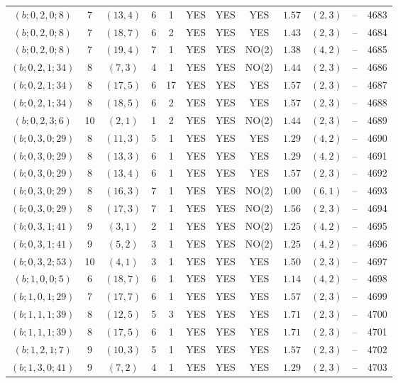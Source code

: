 \begin{longtable}{|c|c|c|c|c|c|c|c|c|c|c|c|}
$(b;0,2,0;8)$ & 7 & $(13,4)$ & 6 & 1 & YES & YES & YES & $1.57$ & $(2,3)$ & -- & 4683\\
$(b;0,2,0;8)$ & 7 & $(18,7)$ & 6 & 2 & YES & YES & YES & $1.43$ & $(2,3)$ & -- & 4684\\
$(b;0,2,0;8)$ & 7 & $(19,4)$ & 7 & 1 & YES & YES & NO(2) & $1.38$ & $(4,2)$ & -- & 4685\\
$(b;0,2,1;34)$ & 8 & $(7,3)$ & 4 & 1 & YES & YES & NO(2) & $1.44$ & $(2,3)$ & -- & 4686\\
$(b;0,2,1;34)$ & 8 & $(17,5)$ & 6 & 17 & YES & YES & YES & $1.57$ & $(2,3)$ & -- & 4687\\
$(b;0,2,1;34)$ & 8 & $(18,5)$ & 6 & 2 & YES & YES & YES & $1.57$ & $(2,3)$ & -- & 4688\\
$(b;0,2,3;6)$ & 10 & $(2,1)$ & 1 & 2 & YES & YES & NO(2) & $1.44$ & $(2,3)$ & -- & 4689\\
$(b;0,3,0;29)$ & 8 & $(11,3)$ & 5 & 1 & YES & YES & YES & $1.29$ & $(4,2)$ & -- & 4690\\
$(b;0,3,0;29)$ & 8 & $(13,3)$ & 6 & 1 & YES & YES & YES & $1.29$ & $(4,2)$ & -- & 4691\\
$(b;0,3,0;29)$ & 8 & $(13,4)$ & 6 & 1 & YES & YES & YES & $1.57$ & $(2,3)$ & -- & 4692\\
$(b;0,3,0;29)$ & 8 & $(16,3)$ & 7 & 1 & YES & YES & NO(2) & $1.00$ & $(6,1)$ & -- & 4693\\
$(b;0,3,0;29)$ & 8 & $(17,3)$ & 7 & 1 & YES & YES & NO(2) & $1.56$ & $(2,3)$ & -- & 4694\\
$(b;0,3,1;41)$ & 9 & $(3,1)$ & 2 & 1 & YES & YES & NO(2) & $1.25$ & $(4,2)$ & -- & 4695\\
$(b;0,3,1;41)$ & 9 & $(5,2)$ & 3 & 1 & YES & YES & NO(2) & $1.25$ & $(4,2)$ & -- & 4696\\
$(b;0,3,2;53)$ & 10 & $(4,1)$ & 3 & 1 & YES & YES & YES & $1.50$ & $(2,3)$ & -- & 4697\\
$(b;1,0,0;5)$ & 6 & $(18,7)$ & 6 & 1 & YES & YES & YES & $1.14$ & $(4,2)$ & -- & 4698\\
$(b;1,0,1;29)$ & 7 & $(17,7)$ & 6 & 1 & YES & YES & YES & $1.57$ & $(2,3)$ & -- & 4699\\
$(b;1,1,1;39)$ & 8 & $(12,5)$ & 5 & 3 & YES & YES & YES & $1.71$ & $(2,3)$ & -- & 4700\\
$(b;1,1,1;39)$ & 8 & $(17,5)$ & 6 & 1 & YES & YES & YES & $1.71$ & $(2,3)$ & -- & 4701\\
$(b;1,2,1;7)$ & 9 & $(10,3)$ & 5 & 1 & YES & YES & YES & $1.57$ & $(2,3)$ & -- & 4702\\
$(b;1,3,0;41)$ & 9 & $(7,2)$ & 4 & 1 & YES & YES & YES & $1.29$ & $(2,3)$ & -- & 4703\\

\end{longtable}

